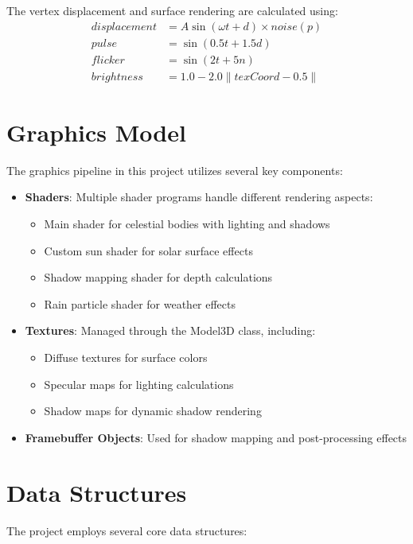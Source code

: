 \documentclass[12pt]{report}
\begin{document}
The vertex displacement and surface rendering are calculated using:
\begin{equation}
\begin{aligned}
displacement &= A \sin(\omega t + d) \times noise(p) \\
pulse &= \sin(0.5t + 1.5d) \\
flicker &= \sin(2t + 5n) \\
brightness &= 1.0 - 2.0\|texCoord - 0.5\|
\end{aligned}
\end{equation}

\section{Graphics Model}
The graphics pipeline in this project utilizes several key components:

\begin{itemize}
    \item \textbf{Shaders}: Multiple shader programs handle different rendering aspects:
        \begin{itemize}
            \item Main shader for celestial bodies with lighting and shadows
            \item Custom sun shader for solar surface effects
            \item Shadow mapping shader for depth calculations
            \item Rain particle shader for weather effects
        \end{itemize}
    \item \textbf{Textures}: Managed through the Model3D class, including:
        \begin{itemize}
            \item Diffuse textures for surface colors
            \item Specular maps for lighting calculations
            \item Shadow maps for dynamic shadow rendering
        \end{itemize}
    \item \textbf{Framebuffer Objects}: Used for shadow mapping and post-processing effects
\end{itemize}

\section{Data Structures}
The project employs several core data structures:
\end{document}
